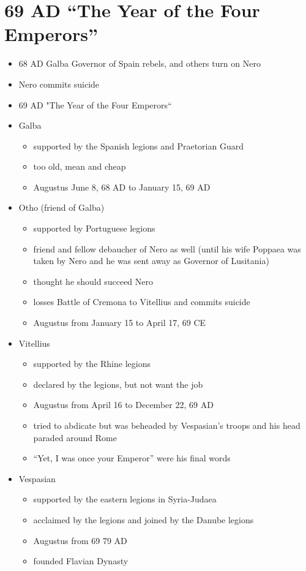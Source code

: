 \documentclass[12pt, twoside]{article}
\begin{document}
\section{69 AD “The Year of the Four Emperors”}
\begin{itemize}
\item 68 AD Galba Governor of Spain rebels, and others turn on Nero
\item Nero commits suicide
\item 69 AD "The Year of the Four Emperors“
\item Galba
	\begin{itemize}
	\item supported by the Spanish legions and Praetorian Guard
	\item too old, mean and cheap
	\item Augustus June 8, 68 AD to January 15, 69 AD
	\end{itemize}
\item Otho (friend of Galba) 
	\begin{itemize}
	\item supported by Portuguese legions
	\item friend and fellow debaucher of Nero as well (until his wife Poppaea was taken by Nero and he was sent away as Governor of Lusitania)
	\item thought he should succeed Nero
	\item losses Battle of Cremona to Vitellius and commits suicide
	\item Augustus from January 15 to April 17, 69 CE
	\end{itemize}
\item Vitellius
	\begin{itemize}
	\item supported by the Rhine legions
	\item declared by the legions, but not want the job
	\item Augustus from April 16 to December 22, 69 AD
	\item tried to abdicate but was beheaded by Vespasian’s troops and his head paraded around Rome
	\item “Yet, I was once your Emperor” were his final words
	\end{itemize}
\item Vespasian
	\begin{itemize}
	\item supported by the eastern legions in Syria-Judaea
	\item acclaimed by the legions and joined by the Danube legions
	\item Augustus from 69 79 AD
	\item founded Flavian Dynasty
	\end{itemize}
\end{itemize}
\end{document}
